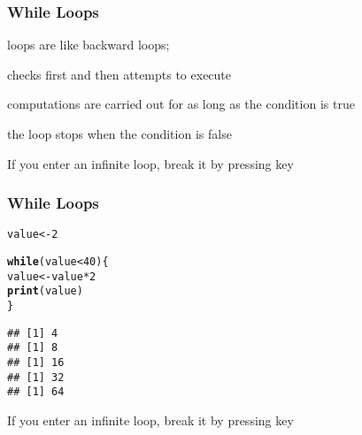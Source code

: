 \documentclass[12pt]{beamer}\usepackage[]{graphicx}\usepackage[]{color}
\makeatletter
\newcommand{\hlnum}[1]{\textcolor[rgb]{0.686,0.059,0.569}{#1}}%
\newcommand{\hlopt}[1]{\textcolor[rgb]{0,0,0}{#1}}%
\newcommand{\hlstd}[1]{\textcolor[rgb]{0.345,0.345,0.345}{#1}}%
\newcommand{\hlkwa}[1]{\textcolor[rgb]{0.161,0.373,0.58}{\textbf{#1}}}%
\newcommand{\hlkwb}[1]{\textcolor[rgb]{0.69,0.353,0.396}{#1}}%
\newcommand{\hlkwd}[1]{\textcolor[rgb]{0.737,0.353,0.396}{\textbf{#1}}}%
\newenvironment{kframe}{%
 \def\at@end@of@kframe{}%
 \ifinner\ifhmode%
  \def\at@end@of@kframe{\end{minipage}}%
  \begin{minipage}{\columnwidth}%
 \fi\fi%
 \def\FrameCommand##1{\hskip\@totalleftmargin \hskip-\fboxsep
 \colorbox{shadecolor}{##1}\hskip-\fboxsep
     \hskip-\linewidth \hskip-\@totalleftmargin \hskip\columnwidth}%
 \MakeFramed {\advance\hsize-\width
   \@totalleftmargin\z@ \linewidth\hsize
   \@setminipage}}%
 {\par\unskip\endMakeFramed%
 \at@end@of@kframe}
\newenvironment{knitrout}{}{} %
\makeatother
\begin{document}

\begin{frame}[fragile]
\frametitle{While Loops}

\bi
  \item {} loops are like backward  loops; 
  \item {} checks first and then attempts to execute
  \item computations are carried out for as long as the condition is true
  \item the loop stops when the condition is false
  \item If you enter an infinite loop, break it by pressing  key
\ei

\end{frame}


\begin{frame}[fragile]
\frametitle{While Loops}

\begin{knitrout}\footnotesize
{}\color{fgcolor}\begin{kframe}
\begin{alltt}
\hlstd{value} \hlkwb{<-} \hlnum{2}

\hlkwa{while} \hlstd{(value} \hlopt{<} \hlnum{40}\hlstd{) \{}
  \hlstd{value} \hlkwb{<-} \hlstd{value} \hlopt{*} \hlnum{2}
  \hlkwd{print}\hlstd{(value)}
\hlstd{\}}
\end{alltt}
\begin{verbatim}
## [1] 4
## [1] 8
## [1] 16
## [1] 32
## [1] 64
\end{verbatim}
\end{kframe}
\end{knitrout}

If you enter an infinite loop, break it by pressing  key

\end{frame}


\begin{frame}
\begin{center}
\Huge{}
\end{center}
\end{frame}

\end{document}
